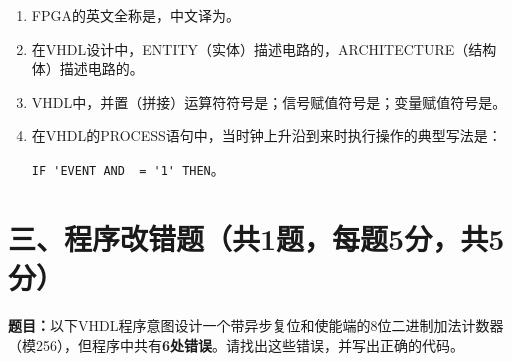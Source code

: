 \begin{enumerate}[label=\arabic*., leftmargin=*]

\item FPGA的英文全称是\underline{\hspace{3cm}}，中文译为\underline{\hspace{3cm}}。

\vspace{0.5cm}

\item 在VHDL设计中，ENTITY（实体）描述电路的\underline{\hspace{2.5cm}}，ARCHITECTURE（结构体）描述电路的\underline{\hspace{2.5cm}}。

\vspace{0.5cm}

\item VHDL中，并置（拼接）运算符符号是\underline{\hspace{1.5cm}}；信号赋值符号是\underline{\hspace{1.5cm}}；变量赋值符号是\underline{\hspace{1.5cm}}。

\vspace{0.5cm}

\item 在VHDL的PROCESS语句中，当时钟上升沿到来时执行操作的典型写法是：

\verb|IF |\underline{\hspace{2cm}}\verb|'EVENT AND |\underline{\hspace{2cm}}\verb| = '1' THEN|。

\vspace{0.5cm}

\end{enumerate}

\section{三、程序改错题（共1题，每题5分，共5分）}

\textbf{题目：}以下VHDL程序意图设计一个带异步复位和使能端的8位二进制加法计数器（模256），但程序中共有\textbf{6处错误}。请找出这些错误，并写出正确的代码。

\vspace{0.3cm}

